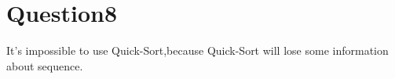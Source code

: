 \section{Question8}
\qquad It's impossible to use Quick-Sort,because Quick-Sort will lose some 
information about sequence.
